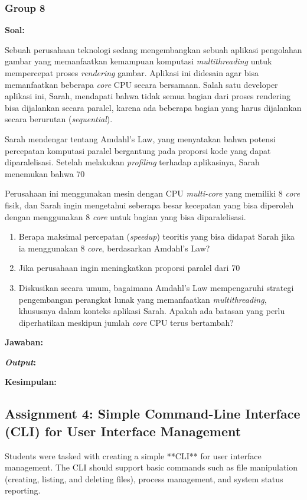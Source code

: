 \documentclass[12pt]{article}
\begin{document}
\subsubsection{Group 8}
\textbf{Soal:}
\par Sebuah perusahaan teknologi sedang mengembangkan sebuah aplikasi pengolahan gambar yang memanfaatkan kemampuan komputasi \textit{multithreading} untuk mempercepat proses \textit{rendering} gambar. Aplikasi ini didesain agar bisa memanfaatkan beberapa \textit{core} CPU secara bersamaan. Salah satu developer aplikasi ini, Sarah, mendapati bahwa tidak semua bagian dari proses rendering bisa dijalankan secara paralel, karena ada beberapa bagian yang harus dijalankan secara berurutan (\textit{sequential}).
\par Sarah mendengar tentang Amdahl’s Law, yang menyatakan bahwa potensi percepatan komputasi paralel bergantung pada proporsi kode yang dapat diparalelisasi. Setelah melakukan \textit{profiling} terhadap aplikasinya, Sarah menemukan bahwa 70%
\par Perusahaan ini menggunakan mesin dengan CPU \textit{multi-core} yang memiliki 8 \textit{core} fisik, dan Sarah ingin mengetahui seberapa besar kecepatan yang bisa diperoleh dengan menggunakan 8 \textit{core} untuk bagian yang bisa diparalelisasi.
\begin{enumerate}
    \item Berapa maksimal percepatan (\textit{speedup}) teoritis yang bisa didapat Sarah jika ia menggunakan 8 \textit{core}, berdasarkan Amdahl’s Law?
    \item Jika perusahaan ingin meningkatkan proporsi paralel dari 70%
    \item Diskusikan secara umum, bagaimana Amdahl’s Law mempengaruhi strategi pengembangan perangkat lunak yang memanfaatkan \textit{multithreading}, khususnya dalam konteks aplikasi Sarah. Apakah ada batasan yang perlu diperhatikan meskipun jumlah \textit{core} CPU terus bertambah?
\end{enumerate}
\par \textbf{Jawaban:}
\par \textbf{\textit{Output}:}
\par \textbf{Kesimpulan:}

\subsection{Assignment 4: Simple Command-Line Interface (CLI) for User Interface Management}
Students were tasked with creating a simple **CLI** for user interface management. The CLI should support basic commands such as file manipulation (creating, listing, and deleting files), process management, and system status reporting.
\end{document}
